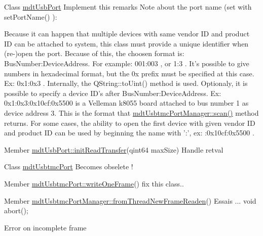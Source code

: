 \begin{DoxyDescription}
\item[Class \hyperlink{classmdt_usb_port}{mdtUsbPort} ]Implement this remarks Note about the port name (set with setPortName() ):\par
 Because it can happen that multiple devices with same vendor ID and product ID can be attached to system, this class must provide a unique identifier when (re-\/)open the port. Because of this, the choosen format is: BusNumber:DeviceAddress. For example: 001:003 , or 1:3 . It's possible to give numbers in hexadecimal format, but the 0x prefix must be specified at this case. Ex: 0x1:0x3 . Internally, the QString::toUint() method is used. Optionaly, it is possible to specify a device ID's after BusNumber:DeviceAddress. Ex: 0x1:0x3:0x10cf:0x5500 is a Velleman k8055 board attached to bus number 1 as device address 3. This is the format that \hyperlink{classmdt_usbtmc_port_manager_a992d1227810186d3c7dc166452e2e3b6}{mdtUsbtmcPortManager::scan()} method returns. For some cases, the ability to open the first device with given vendor ID and product ID can be used by beginning the name with ':', ex: :0x10cf:0x5500 . 
\end{DoxyDescription}

\label{todo__todo000037}
\hypertarget{todo__todo000037}{}
 
\begin{DoxyDescription}
\item[Member \hyperlink{classmdt_usb_port_a5e380852b8726f71e8558c86cba5bd1f}{mdtUsbPort::initReadTransfer}(qint64 maxSize) ]Handle retval 
\end{DoxyDescription}

\label{todo__todo000010}
\hypertarget{todo__todo000010}{}
 
\begin{DoxyDescription}
\item[Class \hyperlink{classmdt_usbtmc_port}{mdtUsbtmcPort} ]Becomes obselete ! 
\end{DoxyDescription}

\label{todo__todo000011}
\hypertarget{todo__todo000011}{}
 
\begin{DoxyDescription}
\item[Member \hyperlink{classmdt_usbtmc_port_a97fca5f136f232275d90ab5b8c5ce285}{mdtUsbtmcPort::writeOneFrame}() ]fix this class.. 
\end{DoxyDescription}

\label{todo__todo000047}
\hypertarget{todo__todo000047}{}
 
\begin{DoxyDescription}
\item[Member \hyperlink{classmdt_usbtmc_port_manager_aca42b343ae1f6a324e6e45968f03bbea}{mdtUsbtmcPortManager::fromThreadNewFrameReaden}() ]Essais ... void abort(); 

Error on incomplete frame 
\end{DoxyDescription}